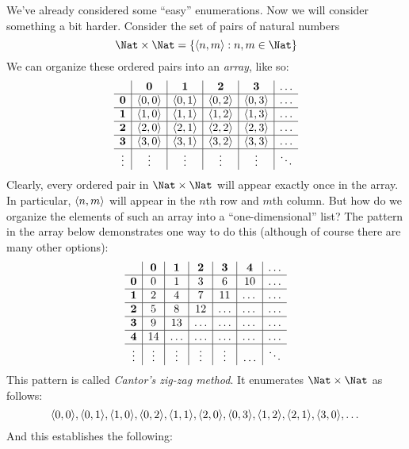 \documentclass[../../../include/open-logic-section]{subfiles}
\begin{document}


\begin{explain}
We've already considered some ``easy'' enumerations. Now we will
consider something a bit harder. Consider the set of pairs of natural
numbers
\[
\Nat \times \Nat = \Setabs{\tuple{n,m}}{n,m \in \Nat}
\]
We can organize these ordered pairs into an \emph{array}, like so:
\[
\begin{array}{ c | c | c | c | c | c}
& \textbf 0 & \textbf 1 & \textbf 2 & \textbf 3 & \dots \\
\hline
\textbf 0 & \tuple{0,0} & \tuple{0,1} & \tuple{0,2} & \tuple{0,3} & \dots \\
\hline
\textbf 1 & \tuple{1,0} & \tuple{1,1} & \tuple{1,2} & \tuple{1,3} & \dots \\
\hline
\textbf 2 & \tuple{2,0} & \tuple{2,1} & \tuple{2,2} & \tuple{2,3} & \dots \\
\hline
\textbf 3 & \tuple{3,0} & \tuple{3,1} & \tuple{3,2} & \tuple{3,3} & \dots \\
\hline
\vdots & \vdots & \vdots & \vdots & \vdots & \ddots\\
\end{array}
\]
Clearly, every ordered pair in $\Nat \times \Nat$ will appear
exactly once in the array. In particular, $\langle n,m \rangle$ will appear in
the $n$th row and $m$th column. But how do we organize the elements of
such an array into a ``one-dimensional'' list? The pattern in the array below
demonstrates one way to do this (although of course there are many other options):
\[
\begin{array}{ c | c | c | c | c | c | c}
& \textbf 0 & \textbf 1 & \textbf 2 & \textbf 3 & \textbf 4 &\dots \\
\hline
\textbf 0 & 0  & 1& 3 & 6& 10 &\ldots \\
\hline
\textbf 1 &2 & 4& 7 & 11 & \dots &\ldots \\
\hline
\textbf 2 & 5 & 8 & 12 & \ldots & \dots&\ldots \\
\hline
\textbf 3 & 9 & 13 & \ldots & \ldots & \dots & \ldots \\
\hline
\textbf 4 & 14 & \ldots & \ldots & \ldots & \dots & \ldots \\
\hline
\vdots & \vdots & \vdots & \vdots & \vdots&\ldots & \ddots\\
\end{array}
\]\noindent
This pattern is called \emph{Cantor's zig-zag method}. It  enumerates
$\Nat \times \Nat$ as follows:
\[
\langle 0,0 \rangle, \langle 0,1 \rangle, \langle 1,0 \rangle, \langle 0,2 \rangle, \langle 1,1 \rangle,
\langle 2,0 \rangle, \langle 0,3 \rangle, \langle 1,2 \rangle, \langle 2,1 \rangle, \langle 3,0 \rangle, \dots
\]
And this establishes the following:
\end{explain}
\end{document}
